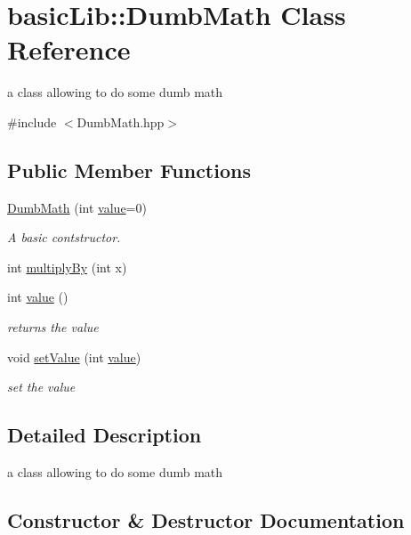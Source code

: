 \hypertarget{classbasic_lib_1_1_dumb_math}{}\section{basic\+Lib\+:\+:Dumb\+Math Class Reference}
\label{classbasic_lib_1_1_dumb_math}


a class allowing to do some dumb math  




{\ttfamily \#include $<$Dumb\+Math.\+hpp$>$}

\subsection*{Public Member Functions}
\begin{DoxyCompactItemize}
\item 
\hyperlink{classbasic_lib_1_1_dumb_math_a7c01975ee34d3783b3517243becc7179}{Dumb\+Math} (int \hyperlink{classbasic_lib_1_1_dumb_math_aa2e0180126b6f246d28da2d224f151b1}{value}=0)
\begin{DoxyCompactList}\small\item\em A basic contstructor. \end{DoxyCompactList}\item 
int \hyperlink{classbasic_lib_1_1_dumb_math_a259a29619fe7b9f3609608e2d764e51b}{multiply\+By} (int x)
\item 
int \hyperlink{classbasic_lib_1_1_dumb_math_aa2e0180126b6f246d28da2d224f151b1}{value} ()
\begin{DoxyCompactList}\small\item\em returns the value \end{DoxyCompactList}\item 
void \hyperlink{classbasic_lib_1_1_dumb_math_aae5e0d45c7487f89bd49e6d84e0a9356}{set\+Value} (int \hyperlink{classbasic_lib_1_1_dumb_math_aa2e0180126b6f246d28da2d224f151b1}{value})
\begin{DoxyCompactList}\small\item\em set the value \end{DoxyCompactList}\end{DoxyCompactItemize}


\subsection{Detailed Description}
a class allowing to do some dumb math 

\subsection{Constructor \& Destructor Documentation}
\mbox{\label{classbasic_lib_1_1_dumb_math_a7c01975ee34d3783b3517243becc7179}} 
